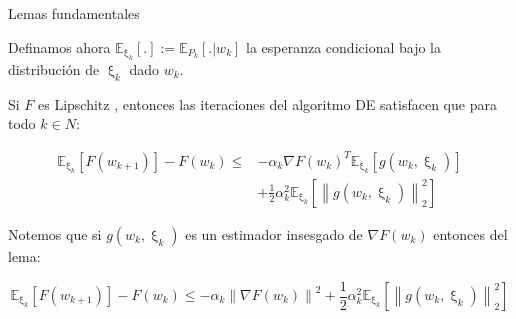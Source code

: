 \documentclass{beamer}
\newcommand{\norm}[1]{\left\lVert#1\right\rVert}
\newcommand{\expectationsub}[2]{\mathbb{E}_{#1} \left[#2\right]}
\begin{document}
\begin{frame}{Lemas fundamentales}

Definamos ahora $\expectationsub{\upxi_k}{.} := \mathbb{E}_{P_k}\left[. \vert w_k\right]$ la esperanza condicional bajo la distribuci\'on de $\upxi_k$ dado $w_k$.

\medskip


\begin{lemma}
	Si $F$ es Lipschitz , entonces las iteraciones del algoritmo DE satisfacen que para todo $k \in N$:
	
	\begin{equation*}
	\begin{aligned}
	\expectationsub{\upxi_{k}}{F(w_{k+1})} - F(w_k) \leq & - \alpha_k \nabla F(w_k) ^T \expectationsub{\upxi_{k}}{g(w_k, \upxi_{k})} \\ & + \frac{1}{2} \alpha_k^2 \expectationsub{\upxi_{k}}{\norm{g(w_k, \upxi_{k})}^2_2}
	\end{aligned}
	\end{equation*}
	
\end{lemma}
\pause
\medskip

	Notemos que si $g(w_k, \upxi_{k})$ es un estimador insesgado de $\nabla F (w_k)$ entonces del lema:
	
	\begin{equation*}
	\expectationsub{\upxi_{k}}{F(w_{k+1})} - F(w_k) \leq - \alpha_k \norm{\nabla F(w_k)}^2 + \frac{1}{2} \alpha_k^2 \expectationsub{\upxi_{k}}{\norm{g(w_k, \upxi_{k})}^2_2}
	\end{equation*}
	

\end{frame}
\end{document}

